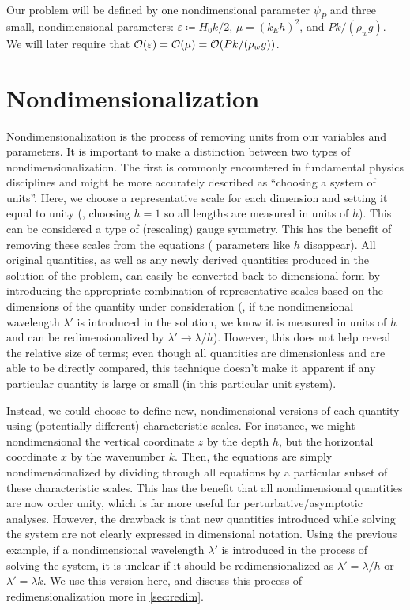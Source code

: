 \documentclass{jfm}
\let\Oldsection\section
\renewcommand{\section}{\FloatBarrier\Oldsection}
\renewcommand*{\epsilon}{\varepsilon}
\begin{document}
Our problem will be defined by one nondimensional parameter $\psi_P$ and
three small, nondimensional parameters: $\epsilon \coloneqq H_0 k/2$,
$\mu = (k_E h)^2$, and $P k/(\rho_w g)$. We will later require that
$\order{\epsilon} = \order{\mu} = \order{P k/(\rho_w g)}$.

\section{Nondimensionalization}
Nondimensionalization is the process of removing units from our
variables and parameters.
It is important to make a distinction between two types of
nondimensionalization.
The first is commonly encountered in fundamental physics disciplines and
might be more accurately described as ``choosing a system of units''.
Here, we choose a representative scale for each dimension and setting it
equal to unity (\eg, choosing $h = 1$ so all lengths are measured in
units of $h$).
This can be considered a type of (rescaling) gauge symmetry.
This has the benefit of removing these scales from the equations (\ie
parameters like $h$ disappear).
All original quantities, as well as any newly derived quantities
produced in the solution of the problem, can easily be converted back to
dimensional form by introducing the appropriate combination of
representative scales based on the dimensions of the quantity under
consideration (\eg, if the nondimensional wavelength $\lambda'$ is
introduced in the solution, we know it is measured in units of $h$ and
can be redimensionalized by $\lambda' \to \lambda/h$).
However, this does not help reveal the relative size of terms; even
though all quantities are dimensionless and are able to be directly
compared, this technique doesn't make it apparent if any particular
quantity is large or small (in this particular unit system).

Instead, we could choose to define new, nondimensional versions of each
quantity using (potentially different) characteristic scales.
For instance, we might nondimensional the vertical coordinate $z$ by the
depth $h$, but the horizontal coordinate $x$ by the wavenumber $k$.
Then, the equations are simply nondimensionalized by dividing
through all equations by a particular subset of these characteristic
scales.
This has the benefit that all nondimensional quantities are now order
unity, which is far more useful for perturbative/asymptotic analyses.
However, the drawback is that new quantities introduced while solving
the system are not clearly expressed in dimensional notation.
Using the previous example, if a nondimensional wavelength $\lambda'$ is
introduced in the process of solving the system, it is unclear if it
should be redimensionalized as $\lambda' = \lambda/h$ or $\lambda' =
\lambda k$.
We use this version here, and discuss this process of
redimensionalization more in \cref{sec:redim}.
\end{document}
